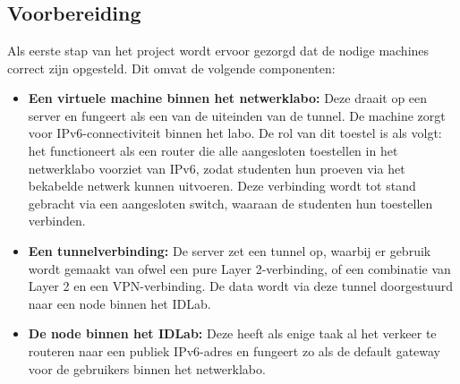 
\chapter{}%
\label{ch:methodologie}


\section{Voorbereiding}
\label{sec:voorbereiding}

Als eerste stap van het project wordt ervoor gezorgd dat de nodige machines correct zijn opgesteld. Dit omvat de volgende componenten:

\begin{itemize}
    \item \textbf{Een virtuele machine binnen het netwerklabo:}  
    Deze draait op een server en fungeert als een van de uiteinden van de tunnel. De machine zorgt voor IPv6-connectiviteit binnen het labo.  
    De rol van dit toestel is als volgt: het functioneert als een router die alle aangesloten toestellen in het netwerklabo voorziet van IPv6, zodat studenten hun proeven via het bekabelde netwerk kunnen uitvoeren.
    Deze verbinding wordt tot stand gebracht via een aangesloten switch, waaraan de studenten hun toestellen verbinden.

    \item \textbf{Een tunnelverbinding:}  
    De server zet een tunnel op, waarbij er gebruik wordt gemaakt van ofwel een pure Layer 2-verbinding, of een combinatie van Layer 2 en een VPN-verbinding. De data wordt via deze tunnel doorgestuurd naar een node binnen het IDLab.

    \item \textbf{De node binnen het IDLab:}  
    Deze heeft als enige taak al het verkeer te routeren naar een publiek IPv6-adres en fungeert zo als de default gateway voor de gebruikers binnen het netwerklabo.
\end{itemize}


